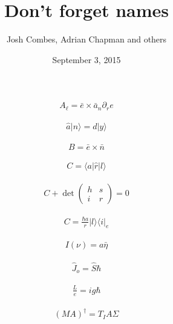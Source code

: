 \documentclass[twocolumn,pra,aps,superscriptaddress]{revtex4-1}
\newcommand{\bra}[1]{\langle{#1}|}
\newcommand{\ket}[1]{|{#1}\rangle}
\newcommand{\op}[2]{\ket{#1}\!\bra{#2}}
\newcommand{\expt}[1]{\langle{#1}\rangle}
\begin{document}
\title{Don't forget names}
\author{Josh Combes, Adrian Chapman and others}

\date{September 3, 2015} %
\begin{abstract}
\end{abstract}
\maketitle




\LARGE
\begin{align}
A_\ell = \bar{e}\times \bar{a}_n \partial_r e
\end{align}

\begin{align}
\hat a\ket{n} = d\ket{y}
\end{align}

\begin{align}
B=\bar{e}\times \bar{n}
\end{align}

\begin{align}
C = \expt{a|\hat r| l}
\end{align}

\begin{align}
C + \det \left(\begin{array}{cc}h & s \\i & r\end{array}\right) = 0
\end{align}

\begin{align}
C = \frac{\hbar a} { r}  \op{l}{ i}_e
\end{align}

\begin{align}
I(\nu) = a\bar{\eta}
\end{align}

\begin{align}
\hat J_o = \hat S \hbar
\end{align}

\begin{align}
\frac{L}{e} = i g\hbar
\end{align}

\begin{align}
(MA)^\dag = T_IA\Sigma
\end{align}
\end{document}
